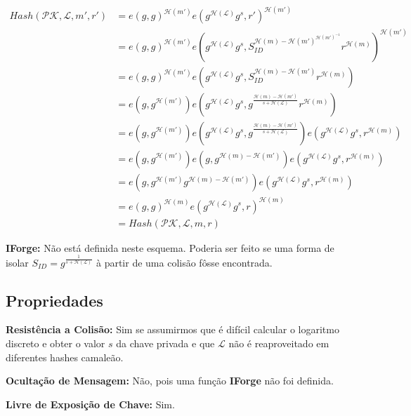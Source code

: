 \documentclass[a4paper]{article}
\begin{document}
\begin{equation}
\begin{split}
  Hash(\mathcal{PK},\mathcal{L}, m', r') &= e(g, g)^{\mathcal{H}(m')}e(g^{\mathcal{H}(\mathcal{L})}g^s, r')^{\mathcal{H}(m')}\\
  &= e(g, g)^{\mathcal{H}(m')}e(g^{\mathcal{H}(\mathcal{L})}g^s, S_{ID}^{\mathcal{H}(m)-\mathcal{H}(m')^{\mathcal{H}(m')^{-1}}}r^{\mathcal{H}(m)})^{\mathcal{H}(m')}\\
  &= e(g, g)^{\mathcal{H}(m')}e(g^{\mathcal{H}(\mathcal{L})}g^s, S_{ID}^{\mathcal{H}(m)-\mathcal{H}(m')}r^{\mathcal{H}(m)})\\
  &= e(g, g^{\mathcal{H}(m')})e(g^{\mathcal{H}(\mathcal{L})}g^s, g^{\frac{\mathcal{H}(m)-\mathcal{H}(m')}{s+\mathcal{H}(\mathcal{L})}}r^{\mathcal{H}(m)})\\
&= e(g, g^{\mathcal{H}(m')})e(g^{\mathcal{H}(\mathcal{L})}g^s, g^{\frac{\mathcal{H}(m)-\mathcal{H}(m')}{s+\mathcal{H}(\mathcal{L})}})e(g^{\mathcal{H}(\mathcal{L})}g^s, r^{\mathcal{H}(m)})\\
  &= e(g, g^{\mathcal{H}(m')})e(g, g^{\mathcal{H}(m)-\mathcal{H}(m')})e(g^{\mathcal{H}(\mathcal{L})}g^s, r^{\mathcal{H}(m)})\\
  &= e(g, g^{\mathcal{H}(m')}g^{\mathcal{H}(m)-\mathcal{H}(m')})e(g^{\mathcal{H}(\mathcal{L})}g^s, r^{\mathcal{H}(m)})\\
  &= e(g, g)^{\mathcal{H}(m)}e(g^{\mathcal{H}(\mathcal{L})}g^s, r)^{\mathcal{H}(m)}\\
&= Hash(\mathcal{PK},\mathcal{L}, m, r)
\end{split}
\end{equation}

\textbf{IForge:} Não está definida neste esquema. Poderia ser feito se
uma forma de isolar $S_{ID} =
g^{\frac{1}{s+\mathcal{H}(\mathcal{L})}}$ à partir de uma colisão
fôsse encontrada.

\subsection{Propriedades}

\textbf{Resistência a Colisão: }Sim se assumirmos que é difícil
calcular o logaritmo discreto e obter o valor $s$ da chave privada e
que $\mathcal{L}$ não é reaproveitado em diferentes hashes camaleão.

\textbf{Ocultação de Mensagem: }Não, pois uma função \textbf{IForge}
não foi definida.

\textbf{Livre de Exposição de Chave: } Sim.
\end{document}
